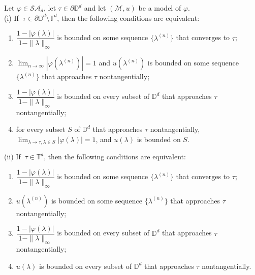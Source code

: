 \documentclass[10pt,a4paper]{amsart}
\newcommand\la{\lambda}
\newcommand{\D}{\mathbb{D}}
\newcommand{\T}{\mathbb{T}}
\begin{document}
\begin{corollary}\label{coro5.7cara}
Let $\varphi\in\mathcal{SA}_{d}$, let $\tau\in\partial\mathbb{D}^{d}$ and let $(\mathcal{M},u)$ be a model of $\varphi$. \\
{\rm (i)} If $ \ \tau \in \partial \D^d \setminus\T^d$, then  the following conditions are equivalent: 
\begin{enumerate}
    \item $\dfrac{1-\lvert \varphi(\lambda) \rvert}{1-\|\lambda\|_{\infty}}$ is bounded on some sequence $\{\lambda^{(n)}\}$ that converges to $\tau$;
    \item $\lim_{n \to \infty} |\varphi(\lambda^{(n)})| =1$ and $u(\lambda^{(n)})$ is bounded on some sequence $\{\lambda^{(n)}\}$ that approaches $\tau$ nontangentially;
    \item $\dfrac{1-\lvert \varphi(\lambda) \rvert}{1-\|\lambda\|_{\infty}}$ is bounded on every subset of $\mathbb{D}^{d}$ that approaches $\tau$ nontangentially;
    \item for every subset $S$ of $\D^d$ that approaches $\tau$ nontangentially,  $\lim_{\la\to\tau, \la\in S} |\varphi(\lambda)| =1$, and  $ u(\lambda) $ is  bounded  on $S$.
\end{enumerate} 
{\rm (ii)} If $ \ \tau \in \T^d$, then  the following conditions are equivalent: 
\begin{enumerate}
    \item $\dfrac{1-\lvert \varphi(\lambda) \rvert}{1-\|\lambda\|_{\infty}}$ is bounded on some sequence $\{\lambda^{(n)}\}$ that converges to $\tau$;
    \item $u(\lambda^{(n)})$ is bounded on some sequence $\{\lambda^{(n)}\}$ that approaches $\tau$ nontangentially;
    \item $\dfrac{1-\lvert \varphi(\lambda) \rvert}{1-\|\lambda\|_{\infty}}$ is bounded on every subset of $\mathbb{D}^{d}$ that approaches $\tau$ nontangentially;
    \item $u(\lambda)$ is bounded on every subset of $\mathbb{D}^{d}$ that approaches $\tau$ nontangentially.
\end{enumerate}
\end{corollary}
\end{document}
